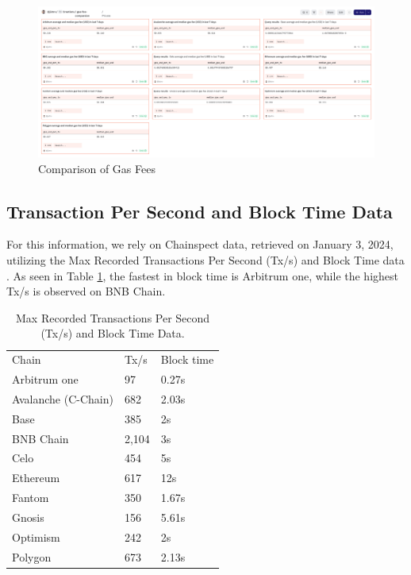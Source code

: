 \documentclass[fleqn,10pt]{olplainarticle}
\begin{document}
\begin{figure}[h]
	\centering
	\includegraphics[width=.7\linewidth]{img/gasFeeComp}
	\caption{Comparison of Gas Fees \cite{jistro_gas_2024}}
	\label{fig:gasfeecomp}
\end{figure}
\pagebreak

\subsection{Transaction Per Second and Block Time Data}

For this information, we rely on Chainspect data, retrieved on January 3, 2024, utilizing the Max Recorded Transactions Per Second (Tx/s) and Block Time data \cite{noauthor_technical_nodate}. As seen in Table \ref{tab:TpsAndBT}, the fastest in block time is Arbitrum one, while the highest Tx/s is observed on BNB Chain.

\begin{table}[H]
	\centering
	\begin{tabular}{lll}
		Chain               & Tx/s   & Block time \\
		Arbitrum one        & 97    & 0.27s      \\
		Avalanche (C-Chain) & 682   & 2.03s      \\
		Base                & 385   & 2s         \\
		BNB Chain           & 2,104 & 3s         \\
		Celo                & 454   & 5s         \\
		Ethereum            & 617   & 12s        \\
		Fantom              & 350   & 1.67s      \\
		Gnosis              & 156   & 5.61s      \\
		Optimism            & 242   & 2s         \\
		Polygon             & 673   & 2.13s     
	\end{tabular}
	\caption{Max Recorded Transactions Per Second (Tx/s) and Block Time Data.}
	\label{tab:TpsAndBT}
\end{table}
\end{document}

